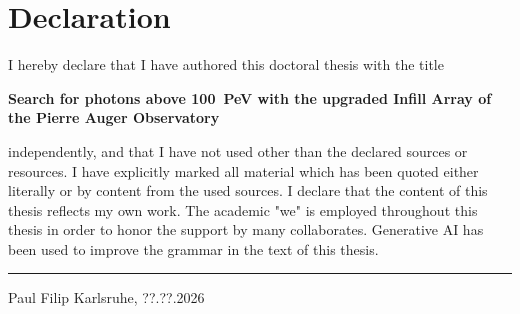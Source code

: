 
\chapter*{Declaration}


\noindent \begin{flushleft}
I hereby declare that I have authored this doctoral thesis with the title 
\par\end{flushleft}

\vspace{0.6cm}
\begin{center}
\Large
\textbf{Search for photons above \SI{100}{\peta\eV} with the upgraded Infill 
Array of the Pierre Auger Observatory}\\
\par\end{center}
\vspace{0.6cm}

\noindent independently, and that I have not used other than the declared 
sources or resources. I have explicitly marked all material which has been 
quoted either literally or by content from the used sources. I declare that 
the content of this thesis reflects my own work. The academic "we" is employed 
throughout this thesis in order to honor the support by many collaborates. 
Generative AI has been used to improve the grammar in the text of this thesis.

\vspace*{2cm}
\begin{minipage}[t]{0.4\columnwidth}%
\rule[0.5ex]{1\columnwidth}{1pt}

Paul Filip \hfill Karlsruhe, ??.??.2026
\end{minipage}

\vfill
\doclicenseThis

